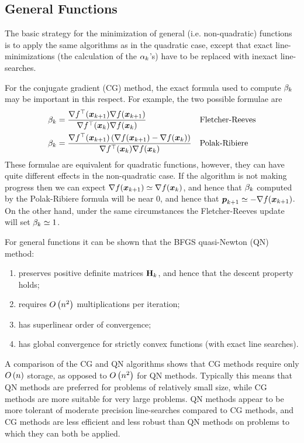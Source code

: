 \subsection{General Functions}

The basic strategy for the minimization of general (i.e. non-quadratic) functions is to apply the same algorithms as in the quadratic case, except that exact line-minimizations (the calculation of the $\alpha_k$'s) have to be replaced with inexact line-searches.

For the conjugate gradient (CG) method, the exact formula used to compute $\beta_k$ may be important in this respect. For example, the two possible formulae are
\begin{align*}
	\beta_k&=\frac{\nabla f^\top(\boldsymbol{x}_{k+1})\nabla f(\boldsymbol{x}_{k+1})}{\nabla f^\top(\boldsymbol{x}_k)\nabla f(\boldsymbol{x}_k)} && \text{Fletcher-Reeves} \\
	\beta_k&=\frac{\nabla f^\top(\boldsymbol{x}_{k+1})\left(\nabla f(\boldsymbol{x}_{k+1})-\nabla f(\boldsymbol{x}_k)\right)}{\nabla f^\top(\boldsymbol{x}_k)\nabla f(\boldsymbol{x}_k)} && \text{Polak-Ribiere}
\end{align*}
These formulae are equivalent for quadratic functions, however, they can have quite different effects in the non-quadratic case. If the algorithm is not making progress then we can expect $\nabla f(\boldsymbol{x}_{k+1})\simeq\nabla f(\boldsymbol{x}_k)$, and hence that $\beta_k$ computed by the Polak-Ribiere formula will be near 0, and hence that $\boldsymbol{p}_{k+1}\simeq-\nabla f(\boldsymbol{x}_{k+1})$. On the other hand, under the same circumstances the Fletcher-Reeves update will set $\beta_k\simeq1$.

For general functions it can be shown that the BFGS quasi-Newton (QN) method:
\begin{enumerate}
	\item preserves positive definite matrices $\mathbf{H}_k$, and hence that the descent property holds;
	\item requires $O\left(n^2\right)$ multiplications per iteration;
	\item has superlinear order of convergence;
	\item has global convergence for strictly convex functions (with exact line searches).
\end{enumerate}

A comparison of the CG and QN algorithms shows that CG methods require only $O\left(n\right)$ storage, as opposed to $O\left(n^2\right)$ for QN methods. Typically this means that QN methods are preferred for problems of relatively small size, while CG methods are more suitable for very large problems. QN methods appear to be more tolerant of moderate precision line-searches compared to CG methods, and CG methods are less efficient and less robust than QN methods on problems to which they can both be applied.

